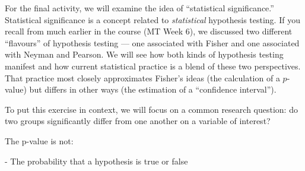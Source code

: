 \documentclass[a4paper,12pt]{article}
\begin{document}
\begin{enumerate*}

\item For the final activity, we will examine the idea of ``statistical significance.'' Statistical significance is a concept related to \textit{statistical} hypothesis testing. If you recall from much earlier in the course (MT Week 6), we discussed two different ``flavours'' of hypothesis testing --- one associated with Fisher and one associated with Neyman and Pearson. We will see how both kinds of hypothesis testing manifest and how current statistical practice is a blend of these two perspectives. That practice most closely approximates Fisher's ideas (the calculation of a $p$-value) but differs in other ways (the estimation of a ``confidence interval'').

\item To put this exercise in context, we will focus on a common research question: do two groups significantly differ from one another on a variable of interest?













The p-value is not:

  - The probability that a hypothesis is true or false


\end{enumerate*}
\end{document}
